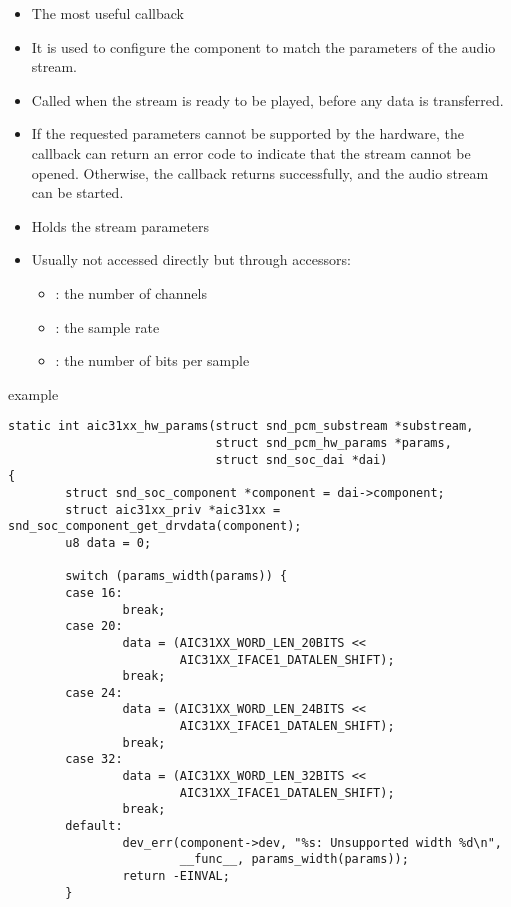 \begin{frame}{}
  \begin{itemize}
  \item The most useful callback
  \item It is used to configure the component to match the parameters
    of the audio stream.
  \item Called when the stream is ready to be played, before any data
    is transferred.
  \item If the requested parameters cannot be supported by the
    hardware, the  callback can return an error code
    to indicate that the stream cannot be opened. Otherwise, the
    callback returns successfully, and the audio stream can be
    started.
  \end{itemize}
\end{frame}

\begin{frame}{}
  \begin{itemize}
  \item Holds the stream parameters
  \item Usually not accessed directly but through accessors:
    \begin{itemize}
    \item {}: the number of channels
    \item {}: the sample rate
    \item {}: the number of bits per sample
    \end{itemize}
  \end{itemize}
\end{frame}

\begin{frame}[fragile]{ example}
  \begin{block}{}
    \fontsize{8}{7}\selectfont
    \begin{verbatim}
static int aic31xx_hw_params(struct snd_pcm_substream *substream,
                             struct snd_pcm_hw_params *params,
                             struct snd_soc_dai *dai)
{
        struct snd_soc_component *component = dai->component;
        struct aic31xx_priv *aic31xx = snd_soc_component_get_drvdata(component);
        u8 data = 0;

        switch (params_width(params)) {
        case 16:
                break;
        case 20:
                data = (AIC31XX_WORD_LEN_20BITS <<
                        AIC31XX_IFACE1_DATALEN_SHIFT);
                break;
        case 24:
                data = (AIC31XX_WORD_LEN_24BITS <<
                        AIC31XX_IFACE1_DATALEN_SHIFT);
                break;
        case 32:
                data = (AIC31XX_WORD_LEN_32BITS <<
                        AIC31XX_IFACE1_DATALEN_SHIFT);
                break;
        default:
                dev_err(component->dev, "%s: Unsupported width %d\n",
                        __func__, params_width(params));
                return -EINVAL;
        }
    \end{verbatim}
  \end{block}
\end{frame}

